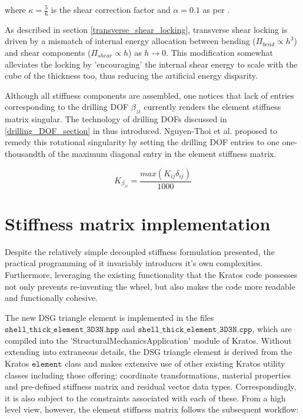 where $\kappa = \frac{5}{6}$ is the shear correction factor and $\alpha = 0.1$ as per \cite{Lyl93}.

As described in section \ref{transverse_shear_locking}, transverse shear locking is driven by a mismatch of internal energy allocation between bending ($\Pi_{bend} \propto h^3$) and shear components ($\Pi_{shear} \propto h$) as $h \rightarrow 0$.  This modification somewhat alleviates the locking by 'encouraging' the internal shear energy to scale with the cube of the thickness too, thus reducing the artificial energy disparity.

Although all stiffness components are assembled, one notices that lack of entries corresponding to the drilling DOF $\beta_{zi}$ currently renders the element stiffness matrix singular. The technology of drilling DOFs discussed in \ref{drilling_DOF_section} in thus introduced. Nguyen-Thoi et al. \cite{Ngu13} proposed to remedy this rotational singularity by setting the drilling DOF entries to one one-thousandth of the maximum diagonal entry in the element stiffness matrix.

\begin{equation} 
K_{\beta_{zi}} =  \frac{max(K_{ij}\delta_{ij})}{1000}
\label{eqtdrilling}
\end{equation}

\section{Stiffness matrix implementation}
Despite the relatively simple decoupled stiffness formulation presented, the practical programming of it invariably introduces it's own complexities. Furthermore, leveraging the existing functionality that the Kratos code possesses not only prevents re-inventing the wheel, but also makes the code more readable and functionally cohesive.  

The new DSG triangle element is implemented in the files $\texttt{shell\_thick\_element\_3D3N.hpp}$ and $\texttt{shell\_thick\_element\_3D3N.cpp}$, which are compiled into the  'StructuralMechanicsApplication' module of Kratos. Without extending into extraneous details, the DSG triangle element is derived from the Kratos $\texttt{element}$ class and makes extensive use of other existing Kratos utility classes including those offering: coordinate transformations, material properties and pre-defined stiffness matrix and residual vector data types. Correspondingly, it is also subject to the constraints associated with each of these. From a high level view, however, the element stiffness matrix follows the subsequent workflow:

